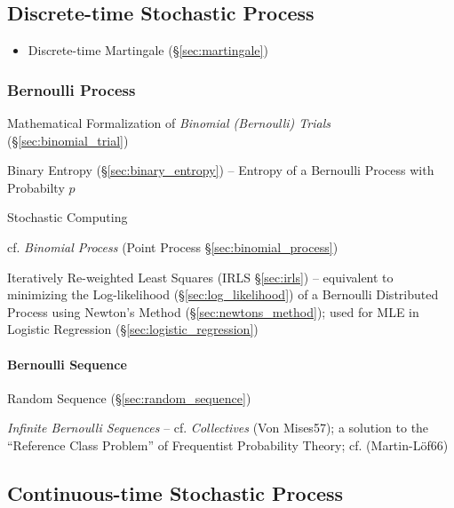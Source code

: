 \subsection{Discrete-time Stochastic Process}\label{sec:discretetime_stochastic}

\begin{itemize}
  \item Discrete-time Martingale (\S\ref{sec:martingale})
\end{itemize}



\subsubsection{Bernoulli Process}\label{sec:bernoulli_process}

Mathematical Formalization of \emph{Binomial (Bernoulli) Trials}
(\S\ref{sec:binomial_trial})

Binary Entropy (\S\ref{sec:binary_entropy}) -- Entropy of a Bernoulli Process
with Probabilty $p$

Stochastic Computing

cf. \emph{Binomial Process} (Point Process \S\ref{sec:binomial_process})

Iteratively Re-weighted Least Squares (IRLS \S\ref{sec:irls}) -- equivalent to
minimizing the Log-likelihood (\S\ref{sec:log_likelihood}) of a Bernoulli
Distributed Process using Newton's Method (\S\ref{sec:newtons_method}); used for
MLE in Logistic Regression (\S\ref{sec:logistic_regression})



\paragraph{Bernoulli Sequence}\label{sec:bernoulli_sequence}\hfill

Random Sequence (\S\ref{sec:random_sequence})

\emph{Infinite Bernoulli Sequences} -- cf. \emph{Collectives} (Von Mises57); a
solution to the ``Reference Class Problem'' of Frequentist Probability Theory;
cf. (Martin-L\"of66)



\subsection{Continuous-time Stochastic Process}\label{sec:continuous_stochastic}

